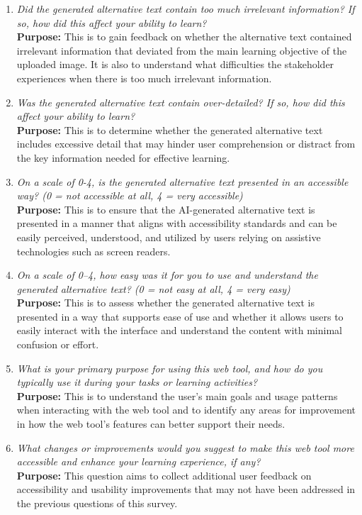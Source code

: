 \documentclass[12pt, titlepage]{article}
\begin{document}
\begin{enumerate}[label=UA-Q \arabic*., wide=0pt, leftmargin=*]
  \item \emph{Did the generated alternative text contain too much
      irrelevant information? If so, how did this affect
    your ability to learn?}\\[2mm]
    {\bf Purpose:} This is to gain feedback on whether the alternative
    text contained irrelevant information that deviated
    from the main learning objective of the uploaded image. It is also
    to understand what difficulties the stakeholder experiences
    when there is too much irrelevant information.

  \item \emph{Was the generated alternative text contain over-detailed?
      If so, how did this affect
    your ability to learn?}\\[2mm]
    {\bf Purpose:} This is to determine whether the generated
    alternative text includes excessive detail that may hinder user
    comprehension or distract from the key information needed for
    effective learning.

  \item \emph{On a scale of 0-4, is the generated alternative text
      presented in an accessible way? (0 = not accessible at all, 4 =
    very accessible)}\\[2mm]
    {\bf Purpose:} This is to ensure that the AI-generated alternative
    text is presented in a manner that aligns with accessibility standards and
    can be easily perceived, understood, and utilized by users relying
    on assistive technologies such as screen readers.

  \item \emph{On a scale of 0–4, how easy was it for you to use and
      understand the generated alternative text? (0 = not easy at all, 4
    = very easy)}\\[2mm]
    {\bf Purpose:} This is to assess whether the generated alternative
    text is presented in a way that supports ease of use and whether it
    allows users to easily interact with
    the interface and understand the content with minimal confusion or effort.

  \item \emph{What is your primary purpose for using this web tool, and
      how do you typically use it during your tasks or learning
    activities?}\\[2mm]
    {\bf Purpose:} This is to understand the user’s main goals and
    usage patterns when interacting with the web tool and to identify
    any areas for improvement in how the web tool's features
    can better support their needs.

  \item \emph{What changes or improvements would you suggest to make
      this web tool more accessible and enhance your learning experience,
    if any?}\\[2mm]
    {\bf Purpose:} This question aims to collect additional user
    feedback on accessibility and usability improvements that may not
    have been addressed in the previous questions of this survey.
\end{enumerate}
\end{document}
